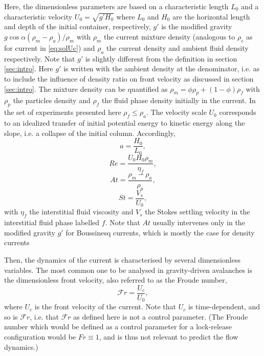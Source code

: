\documentclass[twocolumn]{article}
\begin{document}
Here, the dimensionless parameters are based on a characteristic length $L_0$ and a characteristic velocity $U_0=\sqrt{g' H_0}$ where $L_0$ and $H_0$ are the horizontal length and depth of the initial container, respectively, $g'$ is the modified gravity $ g \cos{\alpha}(\rho_m-\rho_a)/\rho_m$ with $\rho_m$ the current mixture density (analogous to $\rho_c$ as for current in \eqref{eq:solUc}) and $\rho_a$ the current density and ambient fluid density respectively. Note that $g'$ is slightly different from the definition in section \ref{sec:intro}. Here $g'$ is written with the ambient density at the denominator, i.e. as to include the influence of density ratio on front velocity as discussed in section \ref{sec:intro}. The mixture density can be quantified as $\rho_m = \phi \rho_p+(1-\phi)\rho_f$ with $\rho_p$ the particles density and $\rho_f$ the fluid phase density initially in the current. In the set of experiments presented here $\rho_f\le \rho_a$. The velocity scale $U_0$ corresponds to an idealized transfer of initial potential energy to kinetic energy along the slope, i.e. a collapse of the initial column. Accordingly,
\begin{equation}
	\displaystyle a =\frac{H_0}{L_0},
\end{equation}
\begin{equation}
	\displaystyle Re = \frac{U_0 H_0\rho_m}{\eta_f},
\end{equation}
\begin{equation}
	\displaystyle At = \frac{\rho_m-\rho_a}{\rho_a},
\end{equation}
\begin{equation}
	\displaystyle St = \frac{V_s}{U_0},
\end{equation}
with $\eta_f$ the interstitial fluid viscosity and $V_s$ the Stokes settling velocity in the interstitial fluid phase labelled $f$. Note that $At$ usually intervenes only in the modified gravity $g'$ for Boussinesq currents, which is mostly the case for density currents \citep{Bonometti2011,???}

Then, the dynamics of the current is characterised by several dimensionless variables. The most common one to be analysed in gravity-driven avalanches is the dimensionless front velocity, also referred to as the Froude number,
\begin{equation}
	\displaystyle \mathcal{F}r =\frac{U_c}{U_0},
\end{equation}
where $U_c$ is the front velocity of the current. Note that $U_c$ is time-dependent, and so is $\mathcal{F}r$, i.e. that $\mathcal{F}r$ as defined here is not a control parameter. (The Froude number which would be defined as a control parameter for a lock-release configuration would be $Fr\equiv 1$, and is thus not relevant to predict the flow dynamics.)
\end{document}
